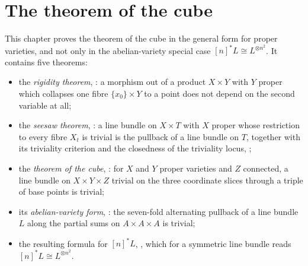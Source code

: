 %
%

\chapter{The theorem of the cube}
\label{chap:cube}

This chapter proves the theorem of the cube in the general form for proper
varieties, and not only in the abelian-variety special case
$[n]^*L\cong L^{\otimes n^2}$.  It contains five theorems:

\begin{itemize}
  \item the \emph{rigidity theorem}, : a morphism out
  of a product $X\times Y$ with $Y$ proper which collapses one fibre
  $\{x_0\}\times Y$ to a point does not depend on the second variable at all;
  \item the \emph{seesaw theorem}, : a line bundle on
  $X\times T$ with $X$ proper whose restriction to every fibre $X_t$ is
  trivial is the pullback of a line bundle on $T$, together with its
  triviality criterion  and the closedness of
  the triviality locus, ;
  \item the \emph{theorem of the cube}, : for $X$ and $Y$
  proper varieties and $Z$ connected, a line bundle on $X\times Y\times Z$
  trivial on the three coordinate slices through a triple of base points is
  trivial;
  \item its \emph{abelian-variety form}, : the
  seven-fold alternating pullback of a line bundle $L$ along the partial sums
  on $A\times A\times A$ is trivial;
  \item the resulting formula for $[n]^*L$, ,
  which for a symmetric line bundle reads $[n]^*L\cong L^{\otimes n^2}$.
\end{itemize}


